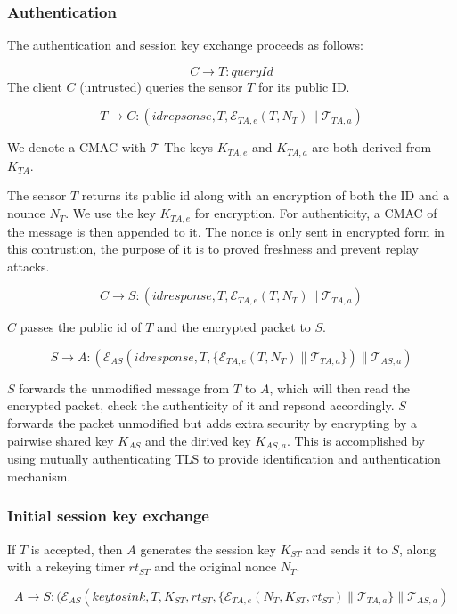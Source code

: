 \subsubsection{Authentication}

The authentication and session key exchange proceeds as follows:

\[
C \rightarrow T: \textit{queryId}
\]
The client $C$ (untrusted) queries the sensor $T$ for its public ID.


\[
T \rightarrow C: (idrepsonse, T, \mathcal{E}_{TA,e}(T, N_T) \parallel \mathcal{T}_{TA,a})
\]

We denote a CMAC with $\mathcal{T}$ The keys $K_{TA,e}$ and $K_{TA,a}$
are both derived from $K_{TA}$.

The sensor $T$ returns its public id along with an encryption of both
the ID and a nounce $N_T$. We use the key $K_{TA,e}$ for
encryption. For authenticity, a CMAC of the message is then appended
to it. The nonce is only sent in encrypted form in this contrustion,
the purpose of it is to proved freshness and prevent replay attacks.

\[
C\rightarrow S: (idresponse,T,\mathcal{E}_{TA,e}(T,N_T) \parallel \mathcal{T}_{TA,a})
\]

$C$ passes the public id of $T$ and the encrypted packet to $S$.

\[
S \rightarrow A: (\mathcal{E}_{AS}(idresponse,T, \{
\mathcal{E}_{TA,e}(T,N_T) \parallel \mathcal{T}_{TA,a} \}) \parallel
\mathcal{T}_{AS,a})
\]

$S$ forwards the unmodified message from $T$ to $A$, which will then
read the encrypted packet, check the authenticity of it and repsond
accordingly. $S$ forwards the packet unmodified but adds extra security
by encrypting by a pairwise shared key $K_{AS}$ and the dirived key
$K_{AS,a}$. This is accomplished by using mutually authenticating TLS
to provide identification and authentication mechanism.

\subsubsection{Initial session key exchange}

If $T$ is accepted, then $A$ generates the session key $K_{ST}$ and
sends it to $S$, along with a rekeying timer $rt_{ST}$ and the
original nonce $N_T$.

\[
A \rightarrow S: (\mathcal{E}_{AS}(keytosink,T,K_{ST},rt_{ST}, \{
\mathcal{E}_{TA,e}(N_T,K_{ST},rt_{ST}) \parallel \mathcal{T}_{TA,a}
\} \parallel \mathcal{T}_{AS,a})
\]

